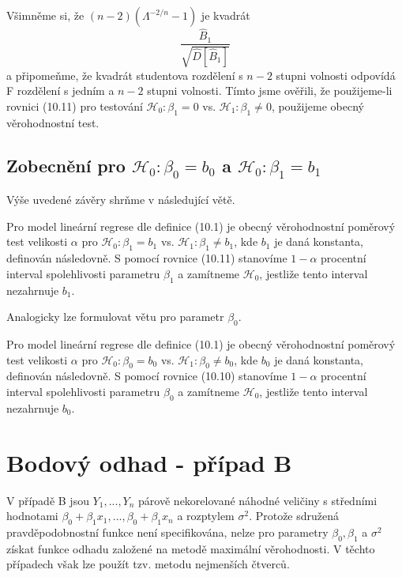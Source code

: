 Všimněme si, že $(n - 2)(\Lambda^{-2/n} - 1)$ je kvadrát
\begin{equation*}
\frac{\hat{B}_1}{\sqrt{\hat{D}[\hat{B}_1]}}
\end{equation*}
a připomeňme, že kvadrát studentova rozdělení s $n - 2$ stupni volnosti odpovídá F rozdělení s jedním a $n - 2$ stupni volnosti. Tímto jsme ověřili, že použijeme-li rovnici (10.11) pro testování $\mathscr{H}_0: \beta_1 = 0$ vs. $\mathscr{H}_1: \beta_1 \neq 0$, použijeme obecný věrohodnostní test.

\subsection{Zobecnění pro $\mathscr{H}_0: \beta_0 = b_0$ a $\mathscr{H}_0: \beta_1 = b_1$}

Výše uvedené závěry shrňme v následující větě.

\begin{theorem}
Pro model lineární regrese dle definice (10.1) je obecný věrohodnostní poměrový test velikosti $\alpha$ pro $\mathscr{H}_0: \beta_1 = b_1$ vs. $\mathscr{H}_1: \beta_1 \neq b_1$, kde $b_1$ je daná konstanta, definován následovně. S pomocí rovnice (10.11) stanovíme $1 - \alpha$ procentní interval spolehlivosti parametru $\beta_1$ a zamítneme $\mathscr{H}_0$, jestliže tento interval nezahrnuje $b_1$.
\end{theorem}

Analogicky lze formulovat větu pro parametr $\beta_0$.

\begin{theorem}
Pro model lineární regrese dle definice (10.1) je obecný věrohodnostní poměrový test velikosti $\alpha$ pro $\mathscr{H}_0: \beta_0 = b_0$ vs. $\mathscr{H}_1: \beta_0 \neq b_0$, kde $b_0$ je daná konstanta, definován následovně. S pomocí rovnice (10.10) stanovíme $1 - \alpha$ procentní interval spolehlivosti parametru $\beta_0$ a zamítneme $\mathscr{H}_0$, jestliže tento interval nezahrnuje $b_0$.
\end{theorem}

\section{Bodový odhad - případ B}

V případě B jsou $Y_1, ..., Y_n$ párově nekorelované náhodné veličiny s středními hodnotami $\beta_0 + \beta_1 x_1, ..., \beta_0 + \beta_1 x_n$ a rozptylem $\sigma^2$. Protože sdružená pravděpodobnostní funkce není specifikována, nelze pro parametry $\beta_0, \beta_1$ a $\sigma^2$ získat funkce odhadu založené na metodě maximální věrohodnosti. V těchto případech však lze použít tzv. metodu nejmenších čtverců.

